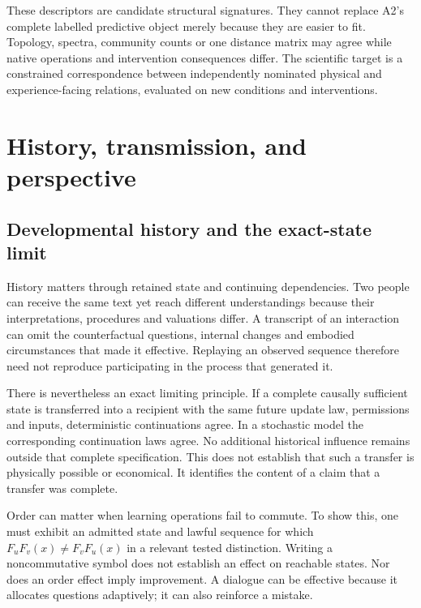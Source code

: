 \documentclass[
  11pt,
  a4paper,
]{article}
\begin{document}
These descriptors are candidate structural signatures. They cannot
replace A2's complete labelled predictive object merely because they are
easier to fit. Topology, spectra, community counts or one distance
matrix may agree while native operations and intervention consequences
differ. The scientific target is a constrained correspondence between
independently nominated physical and experience-facing relations,
evaluated on new conditions and interventions.

\section{History, transmission, and
perspective}\label{history-transmission-and-perspective}

\subsection{Developmental history and the exact-state
limit}\label{developmental-history-and-the-exact-state-limit}

History matters through retained state and continuing dependencies. Two
people can receive the same text yet reach different understandings
because their interpretations, procedures and valuations differ. A
transcript of an interaction can omit the counterfactual questions,
internal changes and embodied circumstances that made it effective.
Replaying an observed sequence therefore need not reproduce
participating in the process that generated it.

There is nevertheless an exact limiting principle. If a complete
causally sufficient state is transferred into a recipient with the same
future update law, permissions and inputs, deterministic continuations
agree. In a stochastic model the corresponding continuation laws agree.
No additional historical influence remains outside that complete
specification. This does not establish that such a transfer is
physically possible or economical. It identifies the content of a claim
that a transfer was complete.

Order can matter when learning operations fail to commute. To show this,
one must exhibit an admitted state and lawful sequence for which
\(F_uF_v(x)\ne F_vF_u(x)\) in a relevant tested distinction. Writing a
noncommutative symbol does not establish an effect on reachable states.
Nor does an order effect imply improvement. A dialogue can be effective
because it allocates questions adaptively; it can also reinforce a
mistake.
\end{document}
